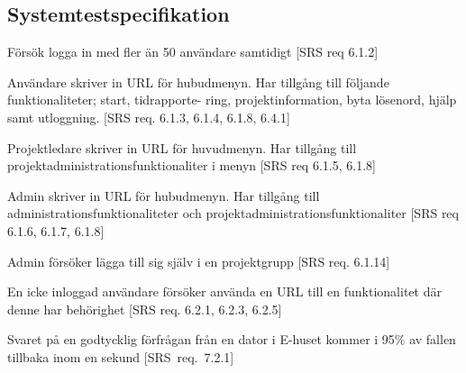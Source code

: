 \documentclass[a4paper]{article}
\begin{document}
\begin{appendices}

\section{Systemtestspecifikation}

\begin{ST}



\item
Försök logga in med fler än 50 användare samtidigt [SRS req 6.1.2]

\item 
Användare skriver in URL för hubudmenyn. Har tillgång till följande funktionaliteter; start, tidrapporte-
ring, projektinformation, byta lösenord, hjälp samt utloggning. [SRS req. 6.1.3, 6.1.4, 6.1.8, 6.4.1]


\item 
Projektledare skriver in URL för huvudmenyn. Har tillgång till projektadministrationsfunktionaliter i menyn [SRS req 6.1.5, 6.1.8]

\item 
Admin skriver in URL för hubudmenyn. Har tillgång till administrationsfunktionaliteter och projektadministrationsfunktionaliter [SRS req 6.1.6, 6.1.7, 6.1.8]

\item
Admin försöker lägga till sig själv i en projektgrupp [SRS req. 6.1.14]

\item
En icke inloggad användare försöker använda en URL till en funktionalitet där denne har behörighet [SRS req. 6.2.1, 6.2.3, 6.2.5]

\item
Svaret på en godtycklig förfrågan från en dator i E-huset kommer i 95\% av fallen tillbaka inom en sekund [SRS~req.~7.2.1]

\end{ST}




\end{appendices}

\newpage
\end{document}
